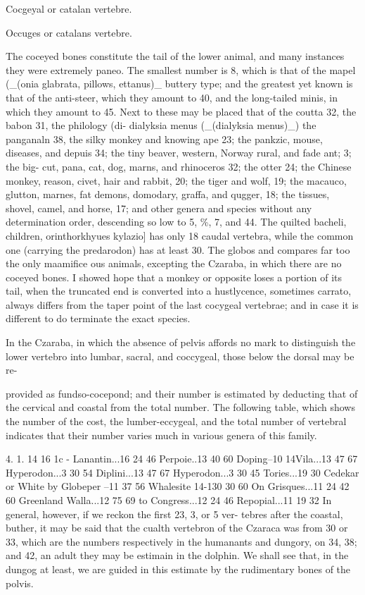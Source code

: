 \documentclass{article}
\begin{document}
Cocgeyal
or catalan
vertebre.

Occuges
or catalans
vertebre.

The coceyed bones constitute the tail of the lower
animal, and many instances they were extremely paneo.
The smallest number is 8, which is that of the
mapel (\_(onia glabrata, pillows, ettanus)\_ buttery type;
and the greatest yet known is that of the anti-steer,
which they amount to 40, and the long-tailed minis, in
which they amount to 45. Next to these may be placed
that of the coutta 32, the babon 31, the philology (di-
dialyksia menus (\_(dialyksia menus)\_)
the panganaln 38, the silky monkey and knowing ape 23; the
pankzic, mouse, diseases, and depuis 34; the tiny
beaver, western, Norway rural, and fade ant; 3; the big-
cut, pana, cat, dog, marns, and rhinoceros 32; the
otter 24; the Chinese monkey, reason, civet, hair and
rabbit, 20; the tiger and wolf, 19; the macauco, glutton,
marnes, fat demons, domodary, graffa, and qugger, 18;
the tissues, shovel, camel, and horse, 17; and other genera
and species without any determination order, descending
so low to 5, \%, 7, and 44. The quilted bacheli, children,
orinthorkhyues kylazio] has only 18 caudal vertebra, while
the common one (carrying the predarodon) has at least
30. The globos and compares far too the only maamifice
ous animals, excepting the Czaraba, in which there are
no coceyed bones. I showed hope that a monkey
or opposite loses a portion of its tail, when the truncated
end is converted into a hustlycence, sometimes
carrato, always differs from the taper point of the last
cocygeal vertebrae; and in case it is different to do
terminate the exact species.

In the Czaraba, in which the absence of pelvis affords
no mark to distinguish the lower vertebro into lumbar,
sacral, and coccygeal, those below the dorsal may be re-

provided as fundso-cocepond; and their number is estimated by deducting that of the cervical and coastal from the total
number. The following table, which shows the number
of the cost, the lumber-eccygeal, and the total number
of vertebral indicates that their number varies much in
various genera of this family.

4. 1. 14 16 1c -
Lanantin...16 24 46 Perpoie..13 40 60
Doping–10 14Vila...13 47 67 Hyperodon...3 30 54
Diplini...13 47 67 Hyperodon...3 30 45
Tories...19 30 Cedekar or White
by Globeper –11 37 56 Whalesite 14-130 30 60
On Grisques...11 24 42 60 Greenland Walla...12 75 69
to Congress...12 24 46 Repopial...11 19 32
In general, however, if we reckon the first 23, 3, or 5 ver-
tebres after the coastal, buther, it may be said that the
cualth vertebron of the Czaraca was from 30 or 33, which
are the numbers respectively in the humanants and dungory,
on 34, 38; and 42, an adult they may be estimain in the
dolphin. We shall see that, in the dungog at least, we are
guided in this estimate by the rudimentary bones of the
polvis.
\end{document}
